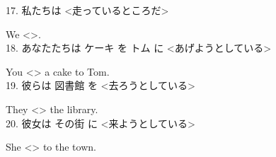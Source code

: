 \documentclass[uplatex,
paper=a4,
fontsize=18pt,
jafontsize=16pt,
number_of_lines=30,
line_length=30zh,
baselineskip=25pt,
]{jlreq}
\begin{document}
17.  私たちは <走っているところだ>

  We <\hspace{3em}\hspace{3em}\hspace{2em}>.
\\

18.  あなたたちは ケーキ を トム に <あげようとしている>

  You <\hspace{3em}\hspace{3em}\hspace{2em}> a cake to Tom.
\\

19.  彼らは 図書館 を <去ろうとしている>

  They <\hspace{3em}\hspace{3em}\hspace{2em}> the library.
\\

20.  彼女は その街 に <来ようとしている>

  She <\hspace{3em}\hspace{3em}\hspace{2em}> to the town.
\\
\end{document}

